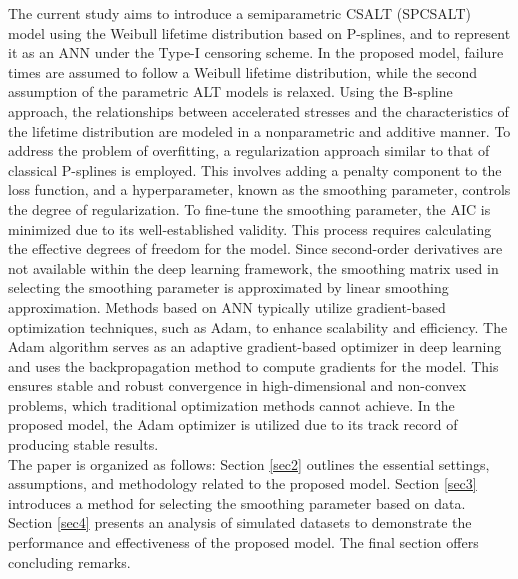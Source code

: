 \documentclass[twoside]{article}
\begin{document}
The current study aims to introduce a semiparametric CSALT (SPCSALT) model using the Weibull lifetime distribution based on P-splines, and to represent it as an ANN under the Type-I censoring scheme. In the proposed model, failure times are assumed to follow a Weibull lifetime distribution, while the second assumption of the parametric ALT models is relaxed. Using the B-spline approach, the relationships between accelerated stresses and the characteristics of the lifetime distribution are modeled in a nonparametric and additive manner. To address the problem of overfitting, a regularization approach similar to that of classical P-splines is employed. This involves adding a penalty component to the loss function, and a hyperparameter, known as the smoothing parameter, controls the degree of regularization. To fine-tune the smoothing parameter, the AIC is minimized due to its well-established validity. This process requires calculating the effective degrees of freedom for the model. Since second-order derivatives are not available within the deep learning framework, the smoothing matrix used in selecting the smoothing parameter is approximated by linear smoothing approximation. Methods based on ANN typically utilize gradient-based optimization techniques, such as Adam, to enhance scalability and efficiency. The Adam algorithm serves as an adaptive gradient-based optimizer in deep learning and uses the backpropagation method to compute gradients for the model. This ensures stable and robust convergence in high-dimensional and non-convex problems, which traditional optimization methods cannot achieve. In the proposed model, the Adam optimizer is utilized due to its track record of producing stable results.\\
The paper is organized as follows: Section \ref{sec2} outlines the essential settings, assumptions, and methodology related to the proposed model. Section \ref{sec3} introduces a method for selecting the smoothing parameter based on data. Section \ref{sec4} presents an analysis of simulated datasets to demonstrate the performance and effectiveness of the proposed model. The final section offers concluding remarks.
\end{document}

